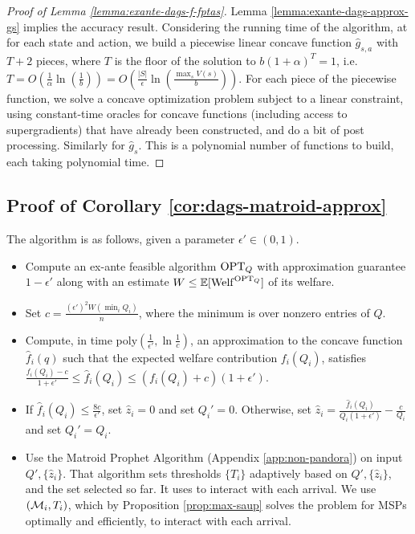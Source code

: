 \begin{proof}[Proof of Lemma \ref{lemma:exante-dags-f-fptas}]
  Lemma \ref{lemma:exante-dags-approx-gs} implies the accuracy result.
  Considering the running time of the algorithm, at for each state and action, we build a piecewise linear concave function $\hat{g}_{s,a}$ with $T+2$ pieces, where $T$ is the floor of the solution to $b(1+\alpha)^T = 1$, i.e. $T = O(\tfrac{1}{\alpha}\ln(\tfrac{1}{b})) = O(\tfrac{|S|}{\epsilon}\ln(\tfrac{\max_s V(s)}{b}))$.
  For each piece of the piecewise function, we solve a concave optimization problem subject to a linear constraint, using constant-time oracles for concave functions (including access to supergradients) that have already been constructed, and do a bit of post processing.
  Similarly for $\hat{g}_s$.
  This is a polynomial number of functions to build, each taking polynomial time.
\end{proof}


\subsection{Proof of Corollary \ref{cor:dags-matroid-approx}}

The algorithm is as follows, given a parameter $\epsilon' \in (0,1)$.
\begin{itemize}
  \item Compute an ex-ante feasible algorithm $\mathrm{OPT}_Q$ with approximation guarantee $1-\epsilon'$ along with an estimate $W \leq \operatorname*{\mathbb{E}}[ \mathrm{Welf}^{\mathrm{OPT}_{Q}}]$ of its welfare.
  \item Set $c= \tfrac{(\epsilon')^2 W (\min_i Q_i)}{n}$, where the minimum is over nonzero entries of $Q$.
  \item Compute, in time poly$(\tfrac{1}{\epsilon'},\ln\tfrac{1}{c})$, an approximation to the concave function $\hat{f}_i(q)$ such that the expected welfare contribution $f_i(Q_i)$, satisfies $\frac{f_i(Q_i) - c}{1+\epsilon'} \leq \hat{f}_i(Q_i) \leq (f_i(Q_i) + c)(1+\epsilon')$.
  \item If $\hat{f}_i(Q_i) \leq \frac{8c}{\epsilon'}$, set $\hat{z}_i = 0$ and set $Q_i' = 0$. Otherwise, set $\hat{z}_i = \frac{\hat{f}_i(Q_i)}{Q_i(1+\epsilon')} - \frac{c}{Q_i}$ and set $Q_i' = Q_i$.
  \item Use the Matroid Prophet Algorithm (Appendix \ref{app:non-pandora}) on input $Q',\{\hat{z}_i\}$.
        That algorithm sets thresholds $\{T_i\}$ adaptively based on $Q',\{\hat{z}_i\}$, and the set selected so far.
        It uses \SAUP{} to interact with each arrival.
        We use \MAXSAUP{}$(\mathcal{M}_i,T_i)$, which by Proposition \ref{prop:max-saup} solves the \SAUP{} problem for MSPs optimally and efficiently, to interact with each arrival.
\end{itemize}

